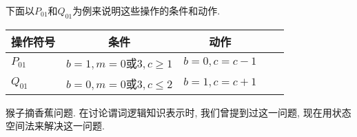 \begin{result}
下面以$P_{01}$和$Q_{01}$为例来说明这些操作的条件和动作.
\begin{table}
\begin{center}
\begin{tabular}{lcccc}
\hline
操作符号                  &  条件                                                                              &  动作\\
\hline
$P_{01}$     &  $b=1, m=0$或$3, c\geq 1$        &  $b=0, c=c-1$\\
$Q_{01}$     &  $b=0, m=0$或$3, c\leq 2 $         &  $b=1, c=c+1$\\
\hline
\end{tabular}
\end{center}
\end{table}
\end{result}
\begin{example}
  猴子摘香蕉问题. 在讨论谓词逻辑知识表示时, 我们曾提到过这一问题, 现在用状态空间法来解决这一问题.
\end{example}

